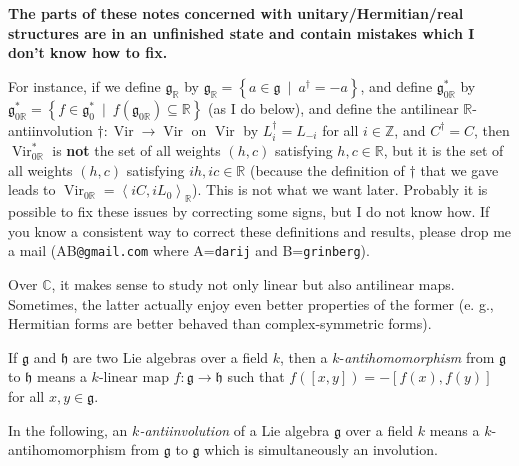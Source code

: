 \documentclass[etingof-lie.tex]{subfiles}
\begin{document}
\begin{impnot}
\textbf{The parts of these notes concerned with unitary/Hermitian/real
structures are in an unfinished state and contain mistakes which I don't know
how to fix.}

For instance, if we define $\mathfrak{g}_{\mathbb{R}}$ by $\mathfrak{g}%
_{\mathbb{R}}=\left\{  a\in\mathfrak{g}\ \mid\ a^{\dag}=-a\right\}  $, and
define $\mathfrak{g}_{0\mathbb{R}}^{\ast}$ by $\mathfrak{g}_{0\mathbb{R}%
}^{\ast}=\left\{  f\in\mathfrak{g}_{0}^{\ast}\ \mid\ f\left(  \mathfrak{g}%
_{0\mathbb{R}}\right)  \subseteq\mathbb{R}\right\}  $ (as I do below), and
define the antilinear $\mathbb{R}$-antiinvolution $\dag:\operatorname*{Vir}%
\rightarrow\operatorname*{Vir}$ on $\operatorname*{Vir}$ by $L_{i}^{\dag
}=L_{-i}$ for all $i\in\mathbb{Z}$, and $C^{\dag}=C$, then
$\operatorname*{Vir}\nolimits_{0\mathbb{R}}^{\ast}$ is \textbf{not} the set of
all weights $\left(  h,c\right)  $ satisfying $h,c\in\mathbb{R}$, but it is
the set of all weights $\left(  h,c\right)  $ satisfying $ih,ic\in\mathbb{R}$
(because the definition of $\dag$ that we gave leads to $\operatorname*{Vir}%
\nolimits_{0\mathbb{R}}=\left\langle iC,iL_{0}\right\rangle _{\mathbb{R}}$).
This is not what we want later. Probably it is possible to fix these issues by
correcting some signs, but I do not know how. If you know a consistent way to
correct these definitions and results, please drop me a mail
(AB\texttt{@gmail.com} where A=\texttt{darij} and B=\texttt{grinberg}).
\end{impnot}

Over $\mathbb{C}$, it makes sense to study not only linear but also antilinear
maps. Sometimes, the latter actually enjoy even better properties of the
former (e. g., Hermitian forms are better behaved than complex-symmetric forms).

\begin{definition}
If $\mathfrak{g}$ and $\mathfrak{h}$ are two Lie algebras over a field $k$,
then a $k$-\textit{antihomomorphism} from $\mathfrak{g}$ to $\mathfrak{h}$
means a $k$-linear map $f:\mathfrak{g}\rightarrow\mathfrak{h}$ such that
$f\left(  \left[  x,y\right]  \right)  =-\left[  f\left(  x\right)  ,f\left(
y\right)  \right]  $ for all $x,y\in\mathfrak{g}$.
\end{definition}

\begin{definition}
In the following, an \textit{$k$-antiinvolution} of a Lie algebra
$\mathfrak{g}$ over a field $k$ means a $k$-antihomomorphism from
$\mathfrak{g}$ to $\mathfrak{g}$ which is simultaneously an involution.
\end{definition}
\end{document}
